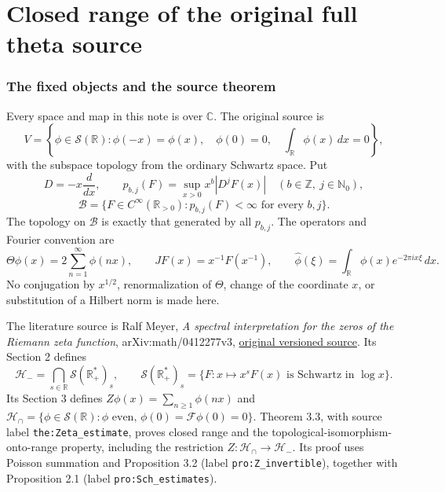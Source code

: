 \endgroup

\clearpage\begingroup
\part*{Closed range of the original full theta source}
\newtheorem{lthetatheorem}{Theorem}
\newtheorem{lthetalemma}[lthetatheorem]{Lemma}
\newtheorem{lthetaproposition}[lthetatheorem]{Proposition}
\newtheorem{lthetacorollary}[lthetatheorem]{Corollary}
\newcommand{\lthetaB}{\mathscr B}
\newcommand{\lthetaSch}{\mathcal S}
\newcommand{\lthetaHH}{\mathcal H}
\newcommand{\lthetaZ}{\mathbb Z}
\newcommand{\lthetaR}{\mathbb R}
\newcommand{\lthetaC}{\mathbb C}
\newcommand{\lthetaN}{\mathbb N}
\newcommand{\lthetaid}{\operatorname{id}}
\newcommand{\lthetacl}{\operatorname{cl}}
\newcommand{\lthetasupp}{\operatorname{supp}}
\newcommand{\lthetaF}{\mathcal F}



\section{The fixed objects and the source theorem}

Every space and map in this note is over $\lthetaC$. The original source is
\[
 V=\left\{\phi\in\lthetaSch(\lthetaR):\phi(-x)=\phi(x),\quad
       \phi(0)=0,\quad \int_\lthetaR\phi(x)\,dx=0\right\},
\]
with the subspace topology from the ordinary Schwartz space. Put
\[
 D=-x\frac{d}{dx},\qquad
 p_{b,j}(F)=\sup_{x>0}x^b|D^jF(x)|\quad(b\in\lthetaZ,\ j\in\lthetaN_0),
\]
\[
 \lthetaB=\{F\in C^\infty(\lthetaR_{>0}):p_{b,j}(F)<\infty
                     \text{ for every }b,j\}.
\]
The topology on $\lthetaB$ is exactly that generated by all $p_{b,j}$. The
operators and Fourier convention are
\begin{equation}\label{ltheta:eq:original}
 \Theta\phi(x)=2\sum_{n=1}^{\infty}\phi(nx),\qquad
 JF(x)=x^{-1}F(x^{-1}),\qquad
 \widehat\phi(\xi)=\int_\lthetaR\phi(x)e^{-2\pi i x\xi}\,dx.
\end{equation}
No conjugation by $x^{1/2}$, renormalization of $\Theta$, change of the
coordinate $x$, or substitution of a Hilbert norm is made here.

The literature source is Ralf Meyer, \emph{A spectral interpretation for
the zeros of the Riemann zeta function}, arXiv:math/0412277v3,
\href{https://arxiv.org/abs/math/0412277v3}{original versioned source}.
Its Section 2 defines
\[
 \lthetaHH_- =\bigcap_{s\in\lthetaR}\lthetaSch(\lthetaR_+^*)_s,\qquad
 \lthetaSch(\lthetaR_+^*)_s=
 \{F:x\mapsto x^sF(x)\text{ is Schwartz in }\log x\}.
\]
Its Section 3 defines $Z\phi(x)=\sum_{n\geq1}\phi(nx)$ and
$\lthetaHH_\cap=\{\phi\in\lthetaSch(\lthetaR):\phi\text{ even},\,
\phi(0)=\lthetaF\phi(0)=0\}$. Theorem 3.3, with source label
\texttt{the:Zeta\_estimate}, proves closed range and the
topological-isomorphism-onto-range property, including the restriction
$Z:\lthetaHH_\cap\to\lthetaHH_-$. Its proof uses Poisson summation and
Proposition 3.2 (label \texttt{pro:Z\_invertible}), together with
Proposition 2.1 (label \texttt{pro:Sch\_estimates}).

